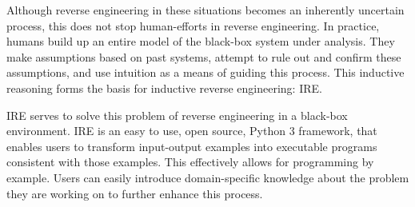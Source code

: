 Although reverse engineering in these situations becomes an inherently uncertain process, this does not stop human-efforts in reverse engineering.
In practice, humans build up an entire model of the black-box system under analysis.
They make assumptions based on past systems, attempt to rule out and confirm these assumptions, and use intuition as a means of guiding this process.
This inductive reasoning forms the basis for inductive reverse engineering: IRE.

IRE serves to solve this problem of reverse engineering in a black-box environment.
IRE is an easy to use, open source, Python 3 framework, that enables users to transform input-output examples into executable programs consistent with those examples.
This effectively allows for programming by example.
Users can easily introduce domain-specific knowledge about the problem they are working on to further enhance this process.
